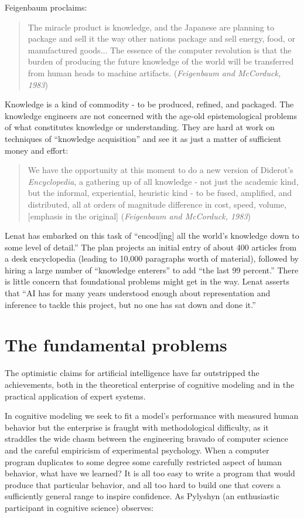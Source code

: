 \documentclass[12pt]{article}
\def\bq{\begin{quote}}
\def\eq{\end{quote}}
\begin{document}
Feigenbaum proclaims:

\bq
The miracle product is knowledge, and the Japanese are planning to package and sell it the way other nations package and sell energy, food, or manufactured goods... The essence of the computer revolution is that the burden of producing the future knowledge of the world will be transferred from human heads to machine artifacts. ({\it Feigenbaum and McCorduck, 1983})
\eq

Knowledge is a kind of commodity - to be produced, refined, and packaged. The knowledge engineers are not concerned with the age-old epistemological problems of what constitutes knowledge or understanding. They are hard at work on techniques of ``knowledge acquisition'' and see it as just a matter of sufficient money and effort:

\bq
We have the opportunity at this moment to do a new version of Diderot’s {\it Encyclopedia}, a gathering up of all knowledge - not just the academic kind, but the informal, experiential, heuristic kind - to be fused, amplified, and distributed, all at orders of magnitude difference in cost, speed, volume, [emphasis in the original] ({\it Feigenbaum and McCorduck, 1983})
\eq

Lenat has embarked on this task of ``encod[ing] all the world's knowledge
down to some level of detail.'' The plan projects an initial entry of
about 400 articles from a desk encyclopedia (leading to 10,000
paragraphs worth of material), followed by hiring a large number of
``knowledge enterers'' to add ``the last 99 percent.'' There is little
concern that foundational problems might get in the way. Lenat asserts
that ``AI has for many years understood enough about representation and
inference to tackle this project, but no one has sat down and done
it.''

\section{The fundamental problems}

The optimistic claims for artificial intelligence have far outstripped the achievements, both in the theoretical enterprise of cognitive modeling and in the practical application of expert systems. 

In cognitive modeling we seek to fit a model’s performance with measured human behavior but the enterprise is fraught with methodological difficulty, as it straddles the wide chasm between the engineering bravado of computer science and the careful empiricism of experimental psychology. When a computer program duplicates to some degree some carefully restricted aspect of human behavior, what have we learned? It is all too easy to write a program that would produce that particular behavior, and all too hard to build one that covers a sufficiently general range to inspire confidence. As Pylyshyn (an enthusiastic participant in cognitive science) observes:
\end{document}
